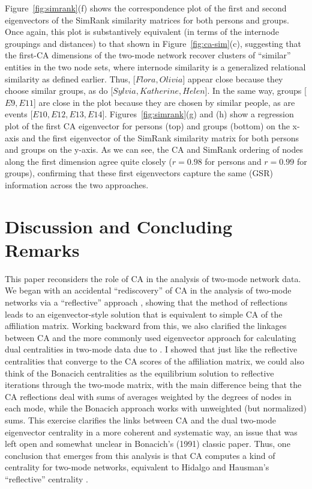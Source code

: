 \documentclass[a4paper,fleqn]{cas-sc}
\begin{document}
Figure~\ref{fig:simrank}(f) shows the correspondence plot of the first and second eigenvectors of the SimRank similarity matrices for both persons and groups. Once again, this plot is substantively equivalent (in terms of the internode groupings and distances) to that shown in Figure~\ref{fig:ca-sim}(c), suggesting that the first-CA dimensions of the two-mode network recover clusters of ``similar'' entities in the two node sets, where internode similarity is a generalized relational similarity as defined earlier. Thus, [$Flora, Olivia$] appear close because they choose similar groups, as do [$Sylvia, Katherine, Helen$]. In the same way, groups [$E9, E11$] are close in the plot because they are chosen by similar people, as are events [$E10, E12, E13, E14$]. Figures~\ref{fig:simrank}(g) and (h) show a regression plot of the first CA eigenvector for persons (top) and groups (bottom) on the x-axis and the first eigenvector of the SimRank similarity matrix for both persons and groups on the y-axis. As we can see, the CA and SimRank ordering of nodes along the first dimension agree quite closely ($r = 0.98$ for persons and $r = 0.99$ for groups), confirming that these first eigenvectors capture the same (GSR) information across the two approaches. 

\section{Discussion and Concluding Remarks} \label{sec:disc}
This paper reconsiders the role of CA in the analysis of two-mode network data. We began with an accidental ``rediscovery'' of CA in the analysis of two-mode networks via a ``reflective'' approach \citep{hidalgo2009building}, showing that the method of reflections leads to an eigenvector-style solution that is equivalent to simple CA of the affiliation matrix. Working backward from this, we also clarified the linkages between CA and the more commonly used eigenvector approach for calculating dual centralities in two-mode data due to \citet{bonacich1991simultaneous}. I showed that just like the reflective centralities that converge to the CA scores of the affiliation matrix, we could also think of the Bonacich centralities as the equilibrium solution to reflective iterations through the two-mode matrix, with the main difference being that the CA reflections deal with sums of averages weighted by the degrees of nodes in each mode, while the Bonacich approach works with unweighted (but normalized) sums. This exercise clarifies the links between CA and the dual two-mode eigenvector centrality in a more coherent and systematic way, an issue that was left open and somewhat unclear in Bonacich's (1991) classic paper. Thus, one conclusion that emerges from this analysis is that CA computes a kind of centrality for two-mode networks, equivalent to Hidalgo and Hausman's ``reflective'' centrality \citep{van2021correspondence}.
\end{document}
